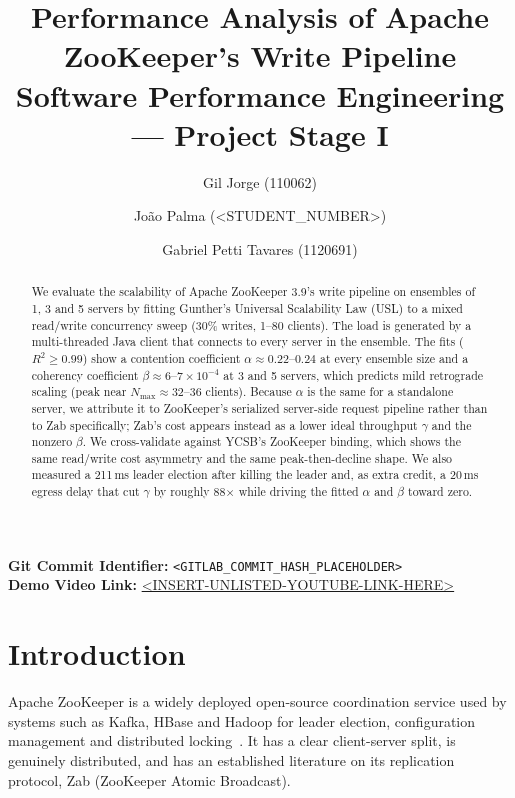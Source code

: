 \documentclass{llncs}
\begin{document}
\title{Performance Analysis of Apache ZooKeeper's Write Pipeline\\
\large Software Performance Engineering --- Project Stage I}

\author{Gil Jorge (110062) \and Jo\~{a}o Palma (<STUDENT\_NUMBER>) \and
  Gabriel Petti Tavares (1120691)}


\maketitle

\begin{abstract}
We evaluate the scalability of Apache ZooKeeper 3.9's write pipeline on
ensembles of 1, 3 and 5 servers by fitting Gunther's Universal
Scalability Law (USL) to a mixed read/write concurrency sweep (30\% writes,
1--80 clients). The load is generated by a multi-threaded Java client that
connects to every server in the ensemble. The fits ($R^2\ge0.99$) show a
contention coefficient $\alpha\approx0.22$--$0.24$ at every ensemble size
and a coherency coefficient $\beta\approx6$--$7\times10^{-4}$ at 3 and 5
servers, which predicts mild retrograde scaling (peak near
$N_{\max}\approx32$--36 clients). Because $\alpha$ is the same for a
standalone server, we attribute it to ZooKeeper's serialized server-side
request pipeline rather than to Zab specifically; Zab's cost appears
instead as a lower ideal throughput $\gamma$ and the nonzero $\beta$. We
cross-validate against YCSB's ZooKeeper binding, which shows the same
read/write cost asymmetry and the same peak-then-decline shape. We also
measured a 211\,ms leader election after killing the leader and, as extra
credit, a 20\,ms egress delay that cut $\gamma$ by roughly 88$\times$
while driving the fitted $\alpha$ and $\beta$ toward zero.
\end{abstract}

\noindent\textbf{Git Commit Identifier:} \texttt{<GITLAB\_COMMIT\_HASH\_PLACEHOLDER>}\\
\noindent\textbf{Demo Video Link:} \url{<INSERT-UNLISTED-YOUTUBE-LINK-HERE>}

\section{Introduction}

Apache ZooKeeper is a widely deployed open-source coordination service
used by systems such as Kafka, HBase and Hadoop for leader election,
configuration management and distributed locking~\cite{apache_zookeeper_overview}.
It has a clear client-server split, is genuinely distributed, and has an
established literature on its replication protocol, Zab
(ZooKeeper Atomic Broadcast).
\end{document}
